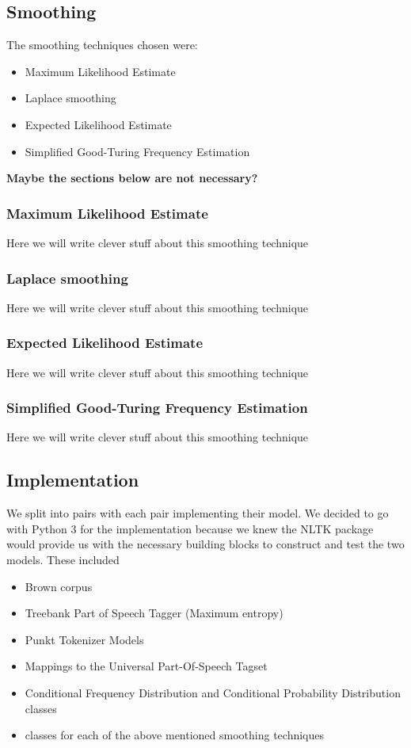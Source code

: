 \documentclass[a4paper,12pt]{article}
\begin{document}
\subsection{Smoothing}
The smoothing techniques chosen were:
\begin{itemize}
\item Maximum Likelihood Estimate
\item Laplace smoothing
\item Expected Likelihood Estimate
\item Simplified Good-Turing Frequency Estimation
\end{itemize}

\textbf{Maybe the sections below are not necessary?}

\subsubsection{Maximum Likelihood Estimate}
Here we will write clever stuff about this smoothing technique

\subsubsection{Laplace smoothing}
Here we will write clever stuff about this smoothing technique

\subsubsection{Expected Likelihood Estimate}
Here we will write clever stuff about this smoothing technique

\subsubsection{Simplified Good-Turing Frequency Estimation}
Here we will write clever stuff about this smoothing technique


\subsection{Implementation}
\label{sec:impl}

We split into pairs with each pair implementing their model. We decided to go with Python 3 for the implementation because we knew the NLTK package would provide us with the necessary building blocks to construct and test the two models. These included
\begin{itemize}
\item Brown corpus
\item Treebank Part of Speech Tagger (Maximum entropy)
\item Punkt Tokenizer Models
\item Mappings to the Universal Part-Of-Speech Tagset
\item Conditional Frequency Distribution and Conditional Probability Distribution classes
\item classes for each of the above mentioned smoothing techniques
\end{itemize}
\end{document}
